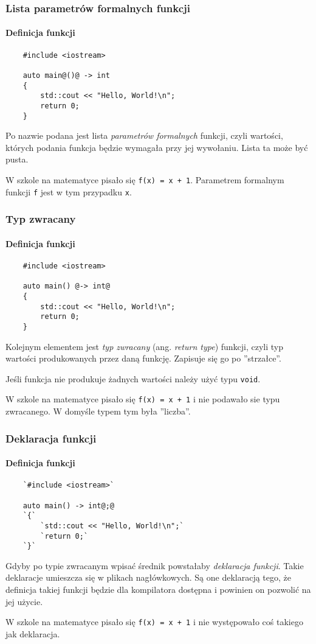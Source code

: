 \documentclass[aspectratio=169]{beamer}
\begin{document}
\begin{frame}[fragile]
    \frametitle{Lista parametrów formalnych funkcji}
    \framesubtitle{Definicja funkcji}

    {\footnotesize
    \begin{lstlisting}
    #include <iostream>

    auto main@()@ -> int
    {
        std::cout << "Hello, World!\n";
        return 0;
    }
    \end{lstlisting}}

    Po nazwie podana jest lista \emph{parametrów formalnych} funkcji, czyli
    wartości, których podania funkcja będzie wymagała przy jej wywołaniu. Lista
    ta może być pusta.

    {\tiny
    W szkole na matematyce pisało się {\tt f(x) = x + 1}. Parametrem formalnym
    funkcji {\tt f} jest w tym przypadku {\tt x}.
    }
\end{frame}

\begin{frame}[fragile]
    \frametitle{Typ zwracany}
    \framesubtitle{Definicja funkcji}

    {\footnotesize
    \begin{lstlisting}
    #include <iostream>

    auto main() @-> int@
    {
        std::cout << "Hello, World!\n";
        return 0;
    }
    \end{lstlisting}}

    Kolejnym elementem jest \emph{typ zwracany} (ang. \emph{return type})
    funkcji, czyli typ wartości produkowanych przez daną funkcję. Zapisuje się
    go po ''strzałce''.

    Jeśli funkcja nie produkuje żadnych wartości należy użyć typu {\tt void}.

    {\tiny
    W szkole na matematyce pisało się {\tt f(x) = x + 1} i nie podawało sie typu
    zwracanego. W domyśle typem tym była ''liczba''.
    }
\end{frame}

\begin{frame}[fragile]
    \frametitle{Deklaracja funkcji}
    \framesubtitle{Definicja funkcji}

    {\footnotesize
    \begin{lstlisting}
    `#include <iostream>`

    auto main() -> int@;@
    `{`
        `std::cout << "Hello, World!\n";`
        `return 0;`
    `}`
    \end{lstlisting}}

    Gdyby po typie zwracanym wpisać średnik powstałaby \emph{deklaracja
    funkcji}. Takie deklaracje umieszcza się w plikach nagłówkowych. Są one
    deklaracją tego, że definicja takiej funkcji będzie dla kompilatora dostępna
    i powinien on pozwolić na jej użycie.

    {\tiny
    W szkole na matematyce pisało się {\tt f(x) = x + 1} i nie występowało coś
    takiego jak deklaracja.
    }
\end{frame}
\end{document}
